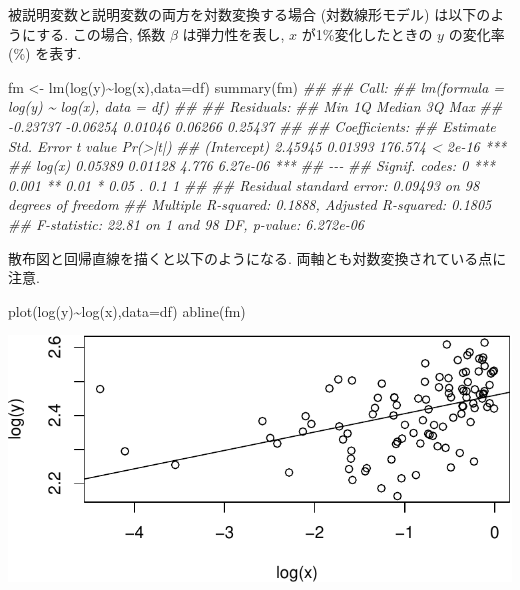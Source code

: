 \documentclass[
  letterpaper,
  xelatex,
  ja=standard, xelatex]{bxjsbook}
\newenvironment{Shaded}{\begin{snugshade}}{\end{snugshade}}
\newcommand{\AttributeTok}[1]{\textcolor[rgb]{0.40,0.45,0.13}{#1}}
\newcommand{\DocumentationTok}[1]{\textcolor[rgb]{0.37,0.37,0.37}{\textit{#1}}}
\newcommand{\FunctionTok}[1]{\textcolor[rgb]{0.28,0.35,0.67}{#1}}
\newcommand{\NormalTok}[1]{\textcolor[rgb]{0.00,0.23,0.31}{#1}}
\newcommand{\OtherTok}[1]{\textcolor[rgb]{0.00,0.23,0.31}{#1}}
\newcommand{\SpecialCharTok}[1]{\textcolor[rgb]{0.37,0.37,0.37}{#1}}
\begin{document}
被説明変数と説明変数の両方を対数変換する場合 (対数線形モデル)
は以下のようにする. この場合, 係数 \(\beta\) は弾力性を表し, \(x\)
が1\%変化したときの \(y\) の変化率 (\%) を表す.

\begin{Shaded}
\begin{Highlighting}[]
\NormalTok{fm }\OtherTok{\textless{}{-}} \FunctionTok{lm}\NormalTok{(}\FunctionTok{log}\NormalTok{(y)}\SpecialCharTok{\textasciitilde{}}\FunctionTok{log}\NormalTok{(x),}\AttributeTok{data=}\NormalTok{df)}
\FunctionTok{summary}\NormalTok{(fm)}
\DocumentationTok{\#\# }
\DocumentationTok{\#\# Call:}
\DocumentationTok{\#\# lm(formula = log(y) \textasciitilde{} log(x), data = df)}
\DocumentationTok{\#\# }
\DocumentationTok{\#\# Residuals:}
\DocumentationTok{\#\#      Min       1Q   Median       3Q      Max }
\DocumentationTok{\#\# {-}0.23737 {-}0.06254  0.01046  0.06266  0.25437 }
\DocumentationTok{\#\# }
\DocumentationTok{\#\# Coefficients:}
\DocumentationTok{\#\#             Estimate Std. Error t value Pr(\textgreater{}|t|)    }
\DocumentationTok{\#\# (Intercept)  2.45945    0.01393 176.574  \textless{} 2e{-}16 ***}
\DocumentationTok{\#\# log(x)       0.05389    0.01128   4.776 6.27e{-}06 ***}
\DocumentationTok{\#\# {-}{-}{-}}
\DocumentationTok{\#\# Signif. codes:  0 \textquotesingle{}***\textquotesingle{} 0.001 \textquotesingle{}**\textquotesingle{} 0.01 \textquotesingle{}*\textquotesingle{} 0.05 \textquotesingle{}.\textquotesingle{} 0.1 \textquotesingle{} \textquotesingle{} 1}
\DocumentationTok{\#\# }
\DocumentationTok{\#\# Residual standard error: 0.09493 on 98 degrees of freedom}
\DocumentationTok{\#\# Multiple R{-}squared:  0.1888, Adjusted R{-}squared:  0.1805 }
\DocumentationTok{\#\# F{-}statistic: 22.81 on 1 and 98 DF,  p{-}value: 6.272e{-}06}
\end{Highlighting}
\end{Shaded}

散布図と回帰直線を描くと以下のようになる.
両軸とも対数変換されている点に注意.

\begin{Shaded}
\begin{Highlighting}[]
\FunctionTok{plot}\NormalTok{(}\FunctionTok{log}\NormalTok{(y)}\SpecialCharTok{\textasciitilde{}}\FunctionTok{log}\NormalTok{(x),}\AttributeTok{data=}\NormalTok{df)}
\FunctionTok{abline}\NormalTok{(fm)}
\end{Highlighting}
\end{Shaded}

\includegraphics{07-regression1_files/figure-pdf/unnamed-chunk-25-1.pdf}
\end{document}
